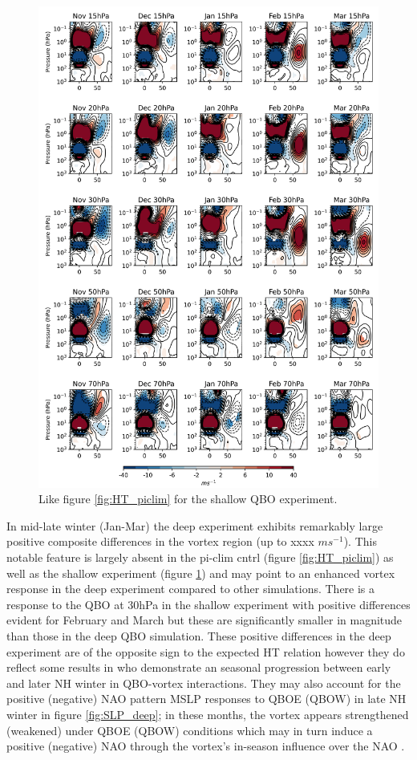 \begin{figure}[h!]
\begin{center}
\noindent\includegraphics[width = 0.9\linewidth]{Figures/Figures-deepQBO/ZMZW_composites_by_month_QBO_phases_U_s_MarQBO_vs_Mar_70hPa_5thresh.png}
\caption[]{Like figure \ref{fig:HT_piclim} for the shallow QBO experiment.}
\label{fig:HT_shallow}
\end{center}
\end{figure}
\newpage 

In mid-late winter (Jan-Mar) the deep experiment exhibits remarkably large positive composite differences in the vortex region (up to xxxx $ms^{-1}$). This notable feature is largely absent in the pi-clim cntrl (figure \ref{fig:HT_piclim}) as well as the shallow experiment (figure \ref{fig:HT_shallow}) and may point to an enhanced vortex response in the deep experiment compared to other simulations. There is a response to the QBO at 30hPa in the shallow experiment with positive differences evident for February and March but these are significantly smaller in magnitude than those in the deep QBO simulation. These positive differences in the deep experiment are of the opposite sign to the expected HT relation however they do reflect some results in \cite{graySurface2018b} who demonstrate an seasonal progression between early and later NH winter in QBO-vortex interactions. They may also account for the positive (negative) NAO pattern MSLP responses to QBOE (QBOW) in late NH winter in figure \ref{fig:SLP_deep}; in these months, the vortex appears strengthened (weakened) under QBOE (QBOW) conditions which may in turn induce a positive (negative) NAO through the vortex's in-season influence over the NAO \citep{charlton-perezInfluence2018e}. 

